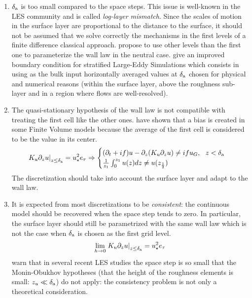 \begin{enumerate}
	\item $\delta_{\rm a}$ is too small compared to the space steps.
		This issue is well-known
		in the LES community and is called
		\textit{log-layer mismatch}.
		Since the scales of motion
		in the surface layer are proportional to the distance
		to the surface, it should not be assumed that we solve
		correctly the mechanisms in the first levels
		of a finite difference classical approach.
		\cite{kawai_wall-modeling_2012} propose to use other
		levels than the first one to parameterize the
		wall law in the neutral case.
		\cite{maronga_improved_2020} give an improved
		boundary condition for stratified Large-Eddy Simulations
		which consists in using as the bulk input
		horizontally averaged values at
		$\delta_{\rm a}$ chosen for physical and numerical
		reasons (within the surface layer, above the
		roughness sub-layer and in a region where flows are
		well-resolved).
	\item The quasi-stationary hypothesis of the wall law is
		not compatible with treating the first cell like
		the other ones.
		\cite{nishizawa_surface_2018} have shown that a
		bias is created in some Finite Volume models
		because the average of the first cell is considered
		to be the value in its center.
		\begin{equation}
		\left.K_u \partial_z u\right|_{z\leq\delta_{\rm a}}
			= u_\star^2 e_\tau
		\Rightarrow
		\begin{cases}
  (\partial_t + if) u - \partial_z (K_u \partial_z u) \neq if u_G
			, ~~ z < \delta_{\rm a}\\
		\frac{1}{z_1}\int_0^{z_1}u(z) dz \neq u(z_\frac{1}{2})
		\end{cases}
		\end{equation}
		The discretization should take into account the
		surface layer and adapt to the wall law.
	\item It is expected from most discretizations to be
		\textit{consistent}: the continuous
		model should be recovered when the space step tends
		to zero.  In particular, the surface layer should
		still be parametrized with the same wall law which
		is not the case when $\delta_{\rm a}$ is chosen
		as the first grid
		level.
		\begin{equation}
			\lim_{h\rightarrow 0}
		\left.K_u \partial_z u\right|_{z\leq\delta_{\rm a}}=
			u_\star^2 e_\tau
		\end{equation}
		\cite{basu_cautionary_2017} warn that
		in several recent LES studies the space step is
		so small that the Monin-Obukhov hypotheses
		(that the height of the roughness elements is small:
		$z_u \ll \delta_{\rm a}$)
		do not apply: the consistency problem is not only
		a theoretical consideration.
\end{enumerate}
